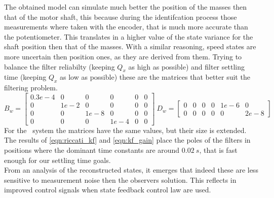 The obtained model can simulate much better the position of the masses then that of the motor shaft, this because during the identifcation process those measurements where taken with the encoder, that is much more accurate than the potentiometer. This translates in a higher value of the state variance for the shaft position then that of the masses. With a similar reasoning, speed states are more uncertain then position ones, as they are derived from them. Trying to balance the filter reliabilty (keeping $Q_x$ as high as possible) and filter settling time (keeping $Q_x$ as low as possible) these are the matrices that better suit the filtering problem.
\begin{equation}
	B_w = \begin{bmatrix}
		0.3e-4 & 0 & 0 & 0 & 0 & 0\\
		0 & 1e-2 & 0 & 0 & 0 & 0 \\
		0 & 0 & 1e-8 & 0 & 0 & 0  \\
		0 & 0 & 0 & 1e-4 & 0 & 0
	\end{bmatrix} \
	D_w = \begin{bmatrix}
		0 & 0 & 0 & 0 & 1e-6 & 0\\
		0 & 0 & 0 & 0 & 0 & 2e-8 
	\end{bmatrix} 
	\label{eqn:b_w_d_w}
\end{equation}
For the \twodof\ system the matrices have the same values, but their size is extended.\\
The results of \cref{eqn:riccati_kf} and \cref{eqn:kf_gain} place the poles of the filters in positions where the dominant time constants are around $0.02\ s$, that is fast enough for our settling time goals. \\

From an analysis of the reconstructed states, it emerges that indeed these are less sensitive to measurement noise then the observers solution. This reflects in improved control signals when state feedback control law are used. \\

